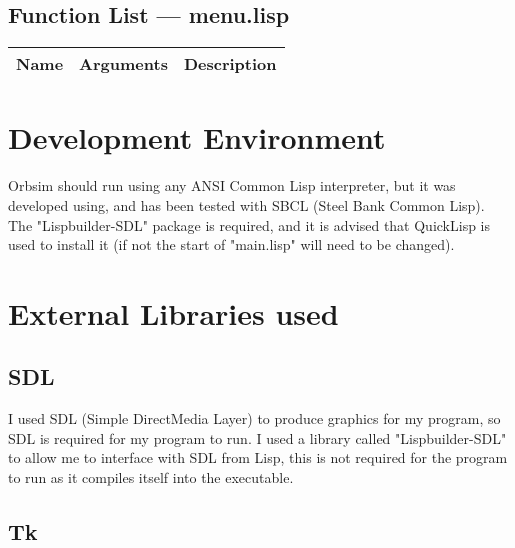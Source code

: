 \subsection{Function List --- menu.lisp}
\begin{tabular}{p{}p{}p{}}
	Name & Arguments & Description\\ \hline

\end{tabular}

\section{Development Environment}
Orbsim should run using any ANSI Common Lisp interpreter, but it was developed
using, and has been tested with SBCL (Steel Bank Common Lisp). The
"Lispbuilder-SDL" package is required, and it is advised that QuickLisp is used
to install it (if not the start of "main.lisp" will need to be changed). 

\section{External Libraries used}
\subsection{SDL}
I used SDL (Simple DirectMedia Layer) to produce graphics for my program, so SDL
is required for my program to run. I used a library called "Lispbuilder-SDL" to
allow me to interface with SDL from Lisp, this is not required for the program
to run as it compiles itself into the executable.

\subsection{Tk}
